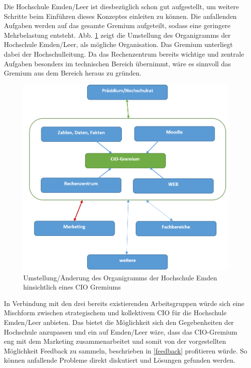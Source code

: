 Die Hochschule Emden/Leer ist diesbezüglich schon gut aufgestellt, um weitere Schritte beim Einführen dieses Konzeptes einleiten zu können. Die anfallenden Aufgaben werden auf das gesamte Gremium aufgeteilt, sodass eine geringere Mehrbelastung entsteht. Abb. \ref{fig_moegliches_gremium} zeigt die Umstellung des Organigramms der Hochschule Emden/Leer, als mögliche Organisation. Das Gremium unterliegt dabei der Hochschulleitung. Da das Rechenzentrum bereits wichtige und zentrale Aufgaben besonders im technischen Bereich übernimmt, wäre es sinnvoll das Gremium aus dem Bereich heraus zu gründen. 
\newpage
\begin{figure}[h]
	\centering
	\includegraphics[width=\textwidth]
	{kapitel/gruppe3/bilder/moegliches_cio_gremium}
	\caption{Umstellung/Änderung des Organigramms der Hochschule Emden 	hinsichtlich eines CIO Gremiums}	
	\label{fig_moegliches_gremium}
\end{figure}

In Verbindung mit den drei bereits existierenden Arbeitsgruppen würde sich eine Mischform zwischen strategischem und kollektivem CIO für die Hochschule Emden/Leer anbieten. Das bietet die Möglichkeit sich den Gegebenheiten der Hochschule anzupassen und ein auf Emden/Leer wäre, dass das CIO-Gremium eng mit dem Marketing zusammenarbeitet und somit von der vorgestellten Möglichkeit Feedback zu sammeln, beschrieben in \ref{feedback} profitieren würde. So können anfallende Probleme direkt diskutiert und Lösungen gefunden werden. 


